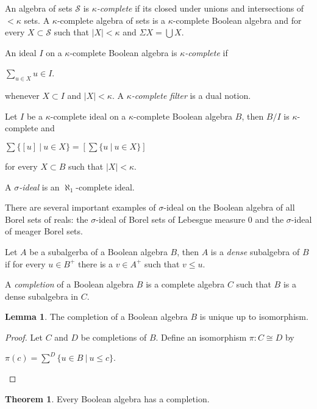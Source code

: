 \documentclass[8pt]{article}
\theoremstyle{definition}
\theoremstyle{definition}
\newtheorem{theorem}{Theorem}[section]
\theoremstyle{definition}
\theoremstyle{definition}
\theoremstyle{definition}
\theoremstyle{definition}
\theoremstyle{definition}
\theoremstyle{definition}
\newtheorem{lemma}{Lemma}[section]
\theoremstyle{definition}
\theoremstyle{definition}
\theoremstyle{definition}
\theoremstyle{definition}
\theoremstyle{definition}
\theoremstyle{definition}
\theoremstyle{question}
\begin{document}
An algebra of sets $\mathcal{S}$ is \emph{$\kappa$-complete} if its closed under unions and
intersections of $< \kappa$ sets. A $\kappa$-complete algebra of sets is a 
$\kappa$-complete Boolean algebra and for every $X \subset \mathcal{S}$ such that $|X| < \kappa$ and $\Sigma X = \bigcup X$.

An ideal $I$ on a $\kappa$-complete Boolean algebra is \emph{$\kappa$-complete} if
\begin{center}
  $\sum \limits_{u \in X} u \in I$.
\end{center}
whenever $X \subset I$ and $|X| < \kappa$. A \emph{$\kappa$-complete filter} is a dual notion.

Let $I$ be a $\kappa$-complete ideal on a $\kappa$-complete Boolean algebra $B$, then $B/I$ is $\kappa$-complete and
\begin{center}
  $\sum \{ [u] \: | \: u \in X \} = [\sum  \{ u \: | \: u \in X \}]$
\end{center}
for every $X \subset B$ such that $|X| < \kappa$.

A \emph{$\sigma$-ideal} is an $\aleph_1$-complete ideal.

There are several important examples of $\sigma$-ideal on the Boolean algebra of all Borel sets of reals:
the $\sigma$-ideal of Borel sets of Lebesgue measure $0$ and the $\sigma$-ideal of meager Borel sets.

Let $A$ be a subalgerba of a Boolean algebra $B$, then $A$ is a \emph{dense} subalgebra of $B$
if for every $u \in B^{+}$ there is a $v \in A^{+}$ such that $v \leq u$.

A \emph{completion} of a Boolean algebra $B$ is a complete algebra $C$ such that $B$ is a dense subalgebra in $C$.

\begin{lemma}
  The completion of a Boolean algebra $B$ is unique up to isomorphism.
\end{lemma}

\begin{proof}
  Let $C$ and $D$ be completions of $B$. Define an isomorphism $\pi : C \cong D$ by
  \begin{center}
    $\pi(c) = \sum^D \{ u \in B \: | \: u \leq c \}$.
  \end{center}
\end{proof}

\begin{theorem}
  Every Boolean algebra has a completion.
\end{theorem}
\end{document}
